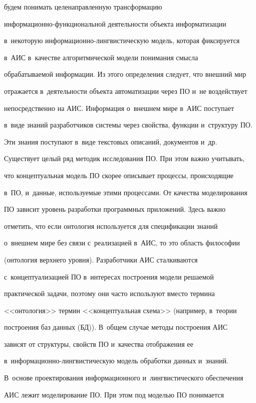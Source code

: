 будем понимать целенаправленную трансформацию  


ин\-фор\-ма\-ци\-он\-но-функ\-ци\-о\-наль\-ной деятельности объекта информатизации 


в~некоторую информационно-лингвистическую модель, которая фиксируется 


в~АИС в~качестве алгоритмической модели понимания смысла 


обрабатываемой информации. Из этого определения следует, что внешний мир 


отражается в~деятельности объекта автоматизации через ПО и~не воздействует 


непосредственно на АИС. Информация о~внешнем мире в~АИС поступает 


в~виде знаний разработчиков системы через свойства, функции и~структуру ПО. 


Эти знания поступают в~виде текстовых описаний, документов и~др. 


Существует целый ряд методик исследования ПО. При этом важно учитывать, 


что концептуальная модель ПО скорее описывает процессы, происходящие 


в~ПО, и~данные, используемые этими процессами. От качества моделирования 


ПО зависит уровень разработки программных приложений. Здесь важно 


отметить, что если онтология используется для спецификации знаний 


о~внешнем мире без связи с~реализацией в~АИС, то это область философии 


(онтология верхнего уровня). Разработчики АИС сталкиваются 


с~концептуализацией ПО в~интересах построения модели решаемой 


практической задачи, поэтому они часто используют вместо термина 


<<онтология>> термин <<концептуальная схема>> (например, в~теории 


построения баз данных (БД)). В~общем случае методы построения АИС 


зависят от структуры, свойств ПО и~качества отображения ее 


в~информационно-лингвистическую модель обработки данных и~знаний. 


В~основе проектирования информационного и~лингвистического обеспечения 


АИС лежит моделирование ПО. При этом под моделью ПО понимается 


